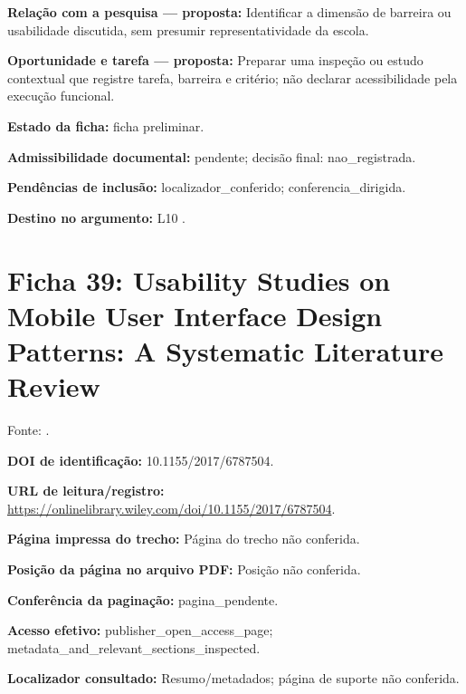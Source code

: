 \noindent\textbf{Relação com a pesquisa — proposta:} Identificar a dimensão de barreira ou usabilidade discutida, sem presumir representatividade da escola.\par\medskip

\noindent\textbf{Oportunidade e tarefa — proposta:} Preparar uma inspeção ou estudo contextual que registre tarefa, barreira e critério; não declarar acessibilidade pela execução funcional.\par\medskip

\noindent\textbf{Estado da ficha:} ficha preliminar.\par\medskip

\noindent\textbf{Admissibilidade documental:} pendente; decisão final: nao\_registrada.\par\medskip

\noindent\textbf{Pendências de inclusão:} localizador\_conferido; conferencia\_dirigida.\par\medskip

\noindent\textbf{Destino no argumento:} L10 .

\clearpage\section*{Ficha 39: Usability Studies on Mobile User Interface Design Patterns: A Systematic Literature Review}

Fonte: \citet{punchoojit2017}.

\noindent\textbf{DOI de identificação:} 10.1155/2017/6787504.\par\medskip

\noindent\textbf{URL de leitura/registro:} \url{https://onlinelibrary.wiley.com/doi/10.1155/2017/6787504}.\par\medskip

\noindent\textbf{Página impressa do trecho:} Página do trecho não conferida.\par\medskip

\noindent\textbf{Posição da página no arquivo PDF:} Posição não conferida.\par\medskip

\noindent\textbf{Conferência da paginação:} pagina\_pendente.\par\medskip

\noindent\textbf{Acesso efetivo:} publisher\_open\_access\_page; metadata\_and\_relevant\_sections\_inspected.\par\medskip

\noindent\textbf{Localizador consultado:} Resumo/metadados; página de suporte não conferida.\par\medskip

